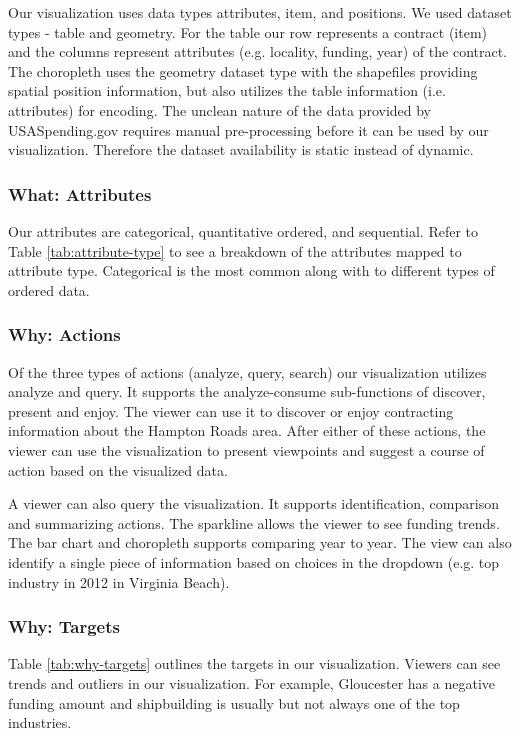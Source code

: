 \documentclass[10pt,journal,compsoc]{IEEEtran}
\begin{document}
Our visualization uses data types attributes, item, and positions. We used dataset types - table and geometry. For the table our row represents a contract (item) and the columns represent attributes (e.g. locality, funding, year) of the contract. The choropleth uses the geometry dataset type with the shapefiles providing spatial position information, but also utilizes the table information (i.e. attributes) for encoding. The unclean nature of the data provided by USASpending.gov requires manual pre-processing before it can be used by our visualization. Therefore the dataset availability is static instead of dynamic.

\subsubsection{What: Attributes}

Our attributes are categorical, quantitative ordered, and sequential. Refer to Table \ref{tab:attribute-type} to see a breakdown of the attributes mapped to attribute type. Categorical is the most common along with to different types of ordered data.

\subsubsection{Why: Actions}

Of the three types of actions (analyze, query, search) our visualization utilizes analyze and query. It supports the analyze-consume sub-functions of discover, present and enjoy. The viewer can use it to discover or enjoy contracting information about the Hampton Roads area. After either of these actions, the viewer can use the visualization to present viewpoints and suggest a course of action based on the visualized data.

A viewer can also query the visualization. It supports identification, comparison and summarizing actions. The sparkline allows the viewer to see funding trends. The bar chart and choropleth supports comparing year to year. The view can also identify a single piece of information based on choices in the dropdown (e.g. top industry in 2012 in Virginia Beach).

\subsubsection{Why: Targets}

Table \ref{tab:why-targets} outlines the targets in our visualization. Viewers can see trends and outliers in our visualization. For example, Gloucester has a negative funding amount and shipbuilding is usually but not always one of the top industries.
\end{document}
